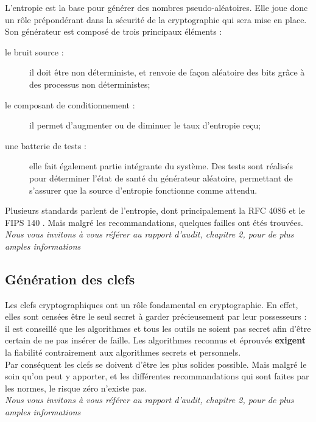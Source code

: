L'entropie est la base pour générer des nombres pseudo-aléatoires. Elle joue donc un rôle prépondérant dans la sécurité de la cryptographie qui sera mise en place. Son générateur est composé de trois principaux éléments : 
\begin{description}
	\item [le bruit source : ] il doit être non déterministe, et renvoie de façon aléatoire des bits grâce à des processus non déterministes;
	\item [le composant de conditionnement : ] il permet d’augmenter ou de diminuer le taux d’entropie reçu;
	\item [une batterie de tests : ] elle fait également partie intégrante du système. Des tests sont réalisés pour déterminer l’état de santé du générateur aléatoire, permettant de s’assurer que la source d’entropie fonctionne comme attendu.\\
\end{description}

Plusieurs standards parlent de l'entropie, dont principalement la RFC 4086 \cite{rfc4086} et le FIPS 140 \cite{fips140-1} \cite{fips140-2}. Mais malgré les recommandations, quelques failles ont étés trouvées.\\

\textit{Nous vous invitons à vous référer au rapport d'audit, chapitre 2, pour de plus amples informations} 

\subsection{Génération des clefs}

Les clefs cryptographiques ont un rôle fondamental en cryptographie. En effet, elles sont censées être le seul secret à garder précieusement par leur possesseurs : il est conseillé que les algorithmes et tous les outils ne soient pas secret afin d'être certain de ne pas insérer de faille. Les algorithmes reconnus et éprouvés \textbf{exigent} la fiabilité contrairement aux algorithmes secrets et personnels.\\

Par conséquent les clefs se doivent d'être les plus solides possible. Mais malgré le soin qu'on peut y apporter, et les différentes recommandations qui sont faites par les normes, le risque zéro n'existe pas.\\

\textit{Nous vous invitons à vous référer au rapport d'audit, chapitre 2, pour de plus amples informations} 

